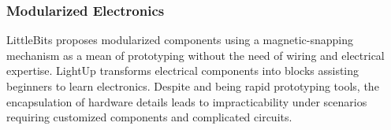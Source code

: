 \subsubsection{Modularized Electronics}

LittleBits \cite{LittleBits} proposes modularized components using a magnetic-snapping mechanism as a mean of prototyping without the need of wiring and electrical expertise.
LightUp \cite{LightUp} transforms electrical components into blocks assisting beginners to learn electronics.
Despite \cite{LittleBits} and \cite{LightUp} being rapid prototyping tools, the encapsulation of hardware details leads to impracticability under scenarios requiring customized components and complicated circuits.




